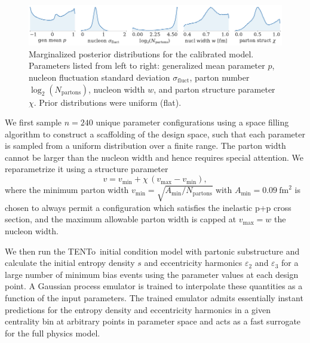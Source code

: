 \documentclass[3p,times,procedia]{elsarticle}
\newcommand{\trento}{T\raisebox{-0.3ex}{R}ENTo}
\newcommand{\e}{\varepsilon}
\begin{document}
\begin{figure}
  \includegraphics{posterior}
  \caption{
    \label{fig:posterior} Marginalized posterior distributions for the calibrated model.
    Parameters listed from left to right: generalized mean parameter $p$, nucleon fluctuation standard deviation $\sigma_\mathrm{fluct}$, parton number $\log_2(N_\mathrm{partons})$, nucleon width $w$, and parton structure parameter $\chi$.
    Prior distributions were uniform (flat).
  }
\end{figure}

We first sample $n=240$ unique parameter configurations using a space filling algorithm to construct a scaffolding of the design space, such that each parameter is sampled from a uniform distribution over a finite range.
The parton width cannot be larger than the nucleon width and hence requires special attention.
We reparametrize it using a structure parameter 
\begin{equation}
  v = v_\mathrm{min} + \chi\, (v_\mathrm{max} - v_\mathrm{min}), 
\end{equation}
where the minimum parton width $v_\mathrm{min}=\sqrt{A_\mathrm{min}/N_\mathrm{partons}}$ with $A_\mathrm{min}=0.09 ~\mathrm{fm}^2$ is chosen to always permit a configuration which satisfies the inelastic p+p cross section, and the maximum allowable parton width is capped at $v_\mathrm{max} = w$ the nucleon width.

We then run the \trento\ initial condition model with partonic substructure and calculate the initial entropy density $s$ and eccentricity harmonics $\e_2$ and $\e_3$ for a large number of minimum bias events using the parameter values at each design point.
A Gaussian process emulator is trained to interpolate these quantities as a function of the input parameters.
The trained emulator admits essentially instant predictions for the entropy density  and eccentricity harmonics in a given centrality bin at arbitrary points in parameter space and acts as a fast surrogate for the full physics model.
\end{document}
